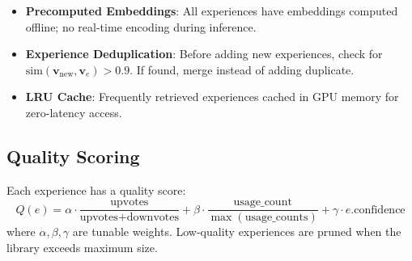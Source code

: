 \begin{itemize}
\item \textbf{Precomputed Embeddings}: All experiences have embeddings computed offline; no real-time encoding during inference.
\item \textbf{Experience Deduplication}: Before adding new experiences, check for $\text{sim}(\mathbf{v}_{\text{new}}, \mathbf{v}_e) > 0.9$. If found, merge instead of adding duplicate.
\item \textbf{LRU Cache}: Frequently retrieved experiences cached in GPU memory for zero-latency access.
\end{itemize}

\subsection{Quality Scoring}

Each experience has a quality score:
\[
Q(e) = \alpha \cdot \frac{\text{upvotes}}{\text{upvotes} + \text{downvotes}} + \beta \cdot \frac{\text{usage\_count}}{\max(\text{usage\_counts})} + \gamma \cdot e.\text{confidence}
\]
where $\alpha, \beta, \gamma$ are tunable weights. Low-quality experiences are pruned when the library exceeds maximum size.

